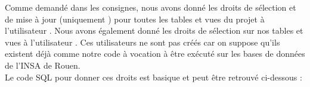 Comme demandé dans les consignes, nous avons donné les droits de sélection et de mise à jour (uniquement ) pour toutes les tables et vues du projet à l'utilisateur . Nous avons également donné les droits de sélection sur nos tables et vues à l'utilisateur . Ces utilisateurs ne sont pas créés car on suppose qu'ils existent déjà comme notre code à vocation à être exécuté sur les bases de données de l'INSA de Rouen.\\

Le code SQL pour donner ces droits est basique et peut être retrouvé ci-dessous :
\inputminted[tabsize=4,linenos,fontsize=\small]{sql}{code/droits.sql}